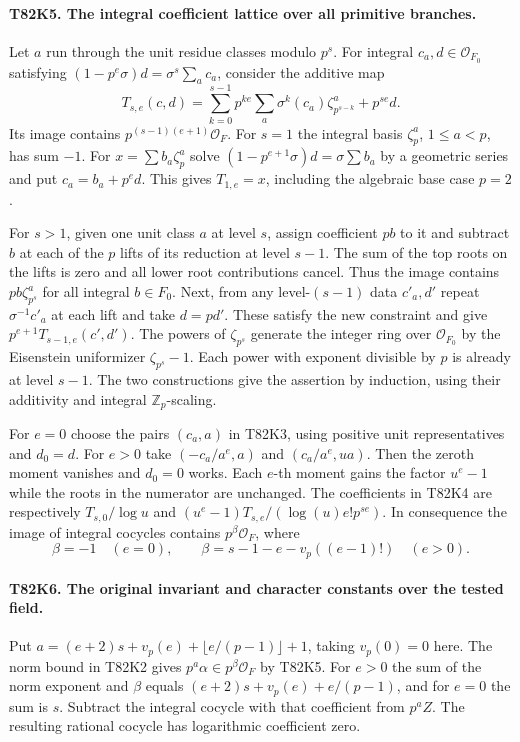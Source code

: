 \paragraph{T82K5. The integral coefficient lattice over all primitive branches.}
Let $a$ run through the unit residue classes modulo $p^s$.
For integral $c_a,d\in\mathcal O_{F_0}$ satisfying
$(1-p^e\sigma)d=\sigma^s\sum_a c_a$, consider the additive map
\[
 T_{s,e}(c,d)=\sum_{k=0}^{s-1}p^{ke}\sum_a\sigma^k(c_a)
                  \zeta_{p^{s-k}}^a+p^{se}d .
\]
Its image contains $p^{(s-1)(e+1)}\mathcal O_F$. For $s=1$ the
integral basis $\zeta_p^a$, $1\le a<p$, has sum $-1$.
For $x=\sum b_a\zeta_p^a$ solve
$(1-p^{e+1}\sigma)d=\sigma\sum b_a$ by a geometric series
and put $c_a=b_a+p^ed$. This gives $T_{1,e}=x$, including the
algebraic base case $p=2$.

For $s>1$, given one unit class $a$ at level $s$, assign coefficient
$pb$ to it and subtract $b$ at each of the $p$ lifts of its reduction
at level $s-1$. The sum of the top roots on the lifts is zero and
all lower root contributions cancel. Thus the image contains
$p b\zeta_{p^s}^a$ for all integral $b\in F_0$. Next, from any
level-$(s-1)$ data $c'_a,d'$ repeat $\sigma^{-1}c'_a$ at each
lift and take $d=pd'$. These satisfy the new constraint and give
$p^{e+1}T_{s-1,e}(c',d')$. The powers of $\zeta_{p^s}$ generate
the integer ring over $\mathcal O_{F_0}$ by the Eisenstein
uniformizer $\zeta_{p^s}-1$. Each power with exponent divisible
by $p$ is already at level $s-1$. The two constructions give the
assertion by induction, using their additivity and integral
$\mathbb Z_p$-scaling.

For $e=0$ choose the pairs $(c_a,a)$ in T82K3, using positive
unit representatives and $d_0=d$. For $e>0$ take
$(-c_a/a^e,a)$ and $(c_a/a^e,ua)$. Then the zeroth moment
vanishes and $d_0=0$ works. Each $e$-th moment gains the factor
$u^e-1$ while the roots in the numerator are unchanged. The
coefficients in T82K4 are respectively $T_{s,0}/\log u$ and
$(u^e-1)T_{s,e}/(\log(u)e!p^{se})$. In consequence the image of
integral cocycles contains $p^\beta\mathcal O_F$, where
\[
 \beta=-1\quad(e=0),\qquad
 \beta=s-1-e-v_p((e-1)!)\quad(e>0).
\]

\paragraph{T82K6. The original invariant and character constants over the tested field.}
Put $a=(e+2)s+v_p(e)+\lfloor e/(p-1)\rfloor+1$, taking
$v_p(0)=0$ here. The norm bound in T82K2 gives
$p^a\alpha\in p^\beta\mathcal O_F$ by T82K5. For $e>0$ the sum
of the norm exponent and $\beta$ equals
$(e+2)s+v_p(e)+e/(p-1)$, and for $e=0$ the sum is $s$.
Subtract the integral cocycle with that coefficient from $p^a Z$.
The resulting rational cocycle has logarithmic coefficient zero.

